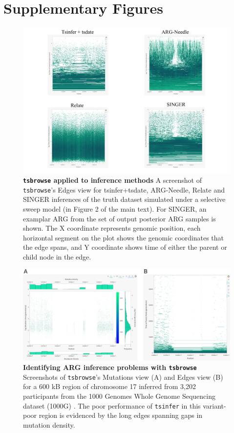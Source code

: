 \documentclass[unnumsec,webpdf,contemporary,large,namedate]{oup-authoring-template}%
\begin{document}
\section{Supplementary Figures}
\begin{figure}
    \centering
    \includegraphics[width=0.95\linewidth]{figures/SuppFig1.png}
    \caption{\textbf{\texttt{tsbrowse} applied to inference methods}
    A screenshot of \texttt{tsbrowse}'s Edges view for tsinfer+tsdate,
ARG-Needle, Relate and SINGER inferences of the truth dataset
simulated under a selective sweep model (in Figure 2 of the main text). For
SINGER, an examplar ARG from the set of output posterior ARG samples is shown.
The X coordinate represents genomic position, each horizontal segment on the
plot shows the genomic coordinates that the edge spans, and Y coordinate shows
time of either the parent or child node in the edge.}
    \label{fig:Supplementary_Figure_1}
\end{figure}

\begin{figure}
    \centering
    \includegraphics[width=0.95\linewidth]{figures/SuppFig2.png}
    \caption{\textbf{Identifying ARG inference problems with \texttt{tsbrowse}} 
Screenshots of \texttt{tsbrowse}'s Mutations view (A) and Edges view (B) for a
 600 kB region of chromosome 17 inferred from 3,202 participants from the 1000 
 Genomes Whole Genome Sequencing dataset (1000G) \citep{1000G2015, 1000GWGS}. 
 The poor performance of \texttt{tsinfer} in this variant-poor region is evidenced
  by the long edges spanning gaps in mutation density.}
    \label{fig:Supplementary_Figure_2}
\end{figure}
\end{document}
